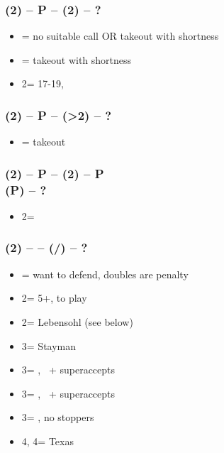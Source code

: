 \documentclass[12pt, a4paper]{report}
\begin{document}
{{        \subsubsection*{(2\diams) -- P -- (2\spades) -- ?}
        \begin{itemize}
            \item \pass = no suitable call OR takeout with \hearts shortness \imp
            \item \dbl = takeout with \spades shortness \imp
            \item 2\nt = 17-19, \bal
        \end{itemize}

        \subsubsection*{(2\diams) -- P -- (>2\spades) -- ?}
        \begin{itemize}
            \item \dbl = takeout \imp
        \end{itemize}

        \subsubsection*{(2\diams) -- P -- (2\hearts) -- P \\
                        (P) -- ?}        
        \begin{itemize}
            \item 2\nt = \minor
        \end{itemize}

        \subsubsection*{(2\diams) -- \dbl -- (\rdbl/\pass) -- ?}        
        \begin{itemize}
            \item \pass = want to defend, doubles are penalty
            \item 2\major = 5+\major, to play
            \item 2\nt = Lebensohl (see below)
            \item 3\clubs = Stayman \vimp
            \item 3\diams = \trsf{\hearts}, \gf\ + superaccepts
            \item 3\hearts = \trsf{\spades}, \gf\ + superaccepts
            \item 3\spades = \trsf{\nt}, no \major stoppers
            \item 4\diams, 4\hearts = Texas
        \end{itemize}

}}
\end{document}
